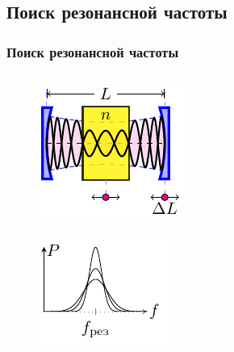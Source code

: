 \subsection{Поиск резонансной частоты}
\begin{frame}[c]%
	\frametitle{Поиск резонансной частоты}
	\vspace{-0.5em}
	\begin{columns}[t]
		\begin{column}{0.49\textwidth}%
			\vspace{-1em}
			\begin{figure}[H]
				\centering
				\includegraphics[width=0.8\linewidth]{ris/dl}
				\label{fig:chem}
			\end{figure}
			\vspace{-2.5em}
			\begin{figure}[H]
				\centering
				\includegraphics[width=0.8\linewidth]{ris/fres}

\end{figure}
\end{column}
\end{columns}
\end{frame}
